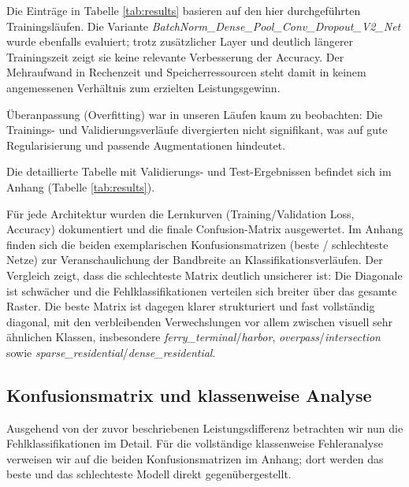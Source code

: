 Die Einträge in Tabelle \ref{tab:results} basieren auf den hier durchgeführten
Trainingsläufen. Die Variante \emph{BatchNorm\_Dense\_Pool\_Conv\_Dropout\_V2\_Net}
wurde ebenfalls evaluiert; trotz zusätzlicher Layer und deutlich längerer
Trainingszeit zeigt sie keine relevante Verbesserung der Accuracy. Der
Mehraufwand in Rechenzeit und Speicherressourcen steht damit in keinem
angemessenen Verhältnis zum erzielten Leistungsgewinn.

Überanpassung (Overfitting) war in unseren Läufen kaum zu beobachten: Die
Trainings- und Validierungsverläufe divergierten nicht signifikant, was auf
gute Regularisierung und passende Augmentationen hindeutet.

Die detaillierte Tabelle mit Validierungs- und Test-Ergebnissen befindet sich im Anhang (Tabelle \ref{tab:results}).

Für jede Architektur wurden die Lernkurven (Training/Validation Loss,
Accuracy) dokumentiert und die finale Confusion-Matrix ausgewertet. Im Anhang
finden sich die beiden exemplarischen Konfusionsmatrizen (beste / schlechteste
Netze) zur Veranschaulichung der Bandbreite an Klassifikationsverläufen. Der
Vergleich zeigt, dass die schlechteste Matrix deutlich unsicherer ist: Die
Diagonale ist schwächer und die Fehlklassifikationen verteilen sich breiter
über das gesamte Raster. Die beste Matrix ist dagegen klarer strukturiert und
fast vollständig diagonal, mit den verbleibenden Verwechslungen vor allem
zwischen visuell sehr ähnlichen Klassen, insbesondere \emph{ferry\_terminal}/\emph{harbor},
\emph{overpass}/\emph{intersection} sowie \emph{sparse\_residential}/\emph{dense\_residential}.

\subsection{Konfusionsmatrix und klassenweise Analyse}
Ausgehend von der zuvor beschriebenen Leistungsdifferenz betrachten wir nun die
Fehlklassifikationen im Detail. Für die vollständige klassenweise Fehleranalyse
verweisen wir auf die beiden Konfusionsmatrizen im Anhang; dort werden das beste
und das schlechteste Modell direkt gegenübergestellt.

